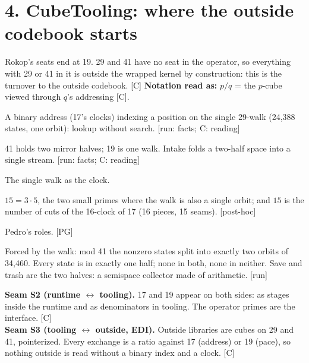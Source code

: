\documentclass[11pt,a4paper]{article}
\newcommand{\stamp}[1]{\textsf{\small[#1]}}
\begin{document}
\section*{4. CubeTooling: where the outside codebook starts}
Rokop's seats end at 19. 29 and 41 have no seat in the operator, so everything with 29 or 41 in it is outside the wrapped kernel by construction: this is the turnover to the outside codebook. \stamp{C}
\textbf{Notation read as:} $p/q$ = the $p$-cube viewed through $q$'s addressing \stamp{C}.
\begin{description}[leftmargin=1.6em,style=nextline]
\item[17/29 lookup] A binary address (17's clocks) indexing a position on the single 29-walk (24,388 states, one orbit): lookup without search. \stamp{run: facts; C: reading}
\item[41/19 in] 41 holds two mirror halves; 19 is one walk. Intake folds a two-half space into a single stream. \stamp{run: facts; C: reading}
\item[19 stream, await] The single walk as the clock.
\item[$17\cdot19/15$ observe, select] $15=3\cdot5$, the two small primes where the walk is also a single orbit; and $15$ is the number of cuts of the 16-clock of 17 (16 pieces, 15 seams). \stamp{post-hoc}
\item[15/29 out, \;$29/(17\cdot19)$ store, serve] Pedro's roles. \stamp{PG}
\item[41 save, $41^{-1}$ trash] Forced by the walk: mod 41 the nonzero states split into exactly two orbits of 34,460. Every state is in exactly one half; none in both, none in neither. Save and trash are the two halves: a semispace collector made of arithmetic. \stamp{run}
\end{description}
\textbf{Seam S2 (runtime $\leftrightarrow$ tooling).} 17 and 19 appear on both sides: as stages inside the runtime and as denominators in tooling. The operator primes are the interface. \stamp{C}\\
\textbf{Seam S3 (tooling $\leftrightarrow$ outside, EDI).} Outside libraries are cubes on 29 and 41, pointerized. Every exchange is a ratio against 17 (address) or 19 (pace), so nothing outside is read without a binary index and a clock. \stamp{C}
\end{document}
